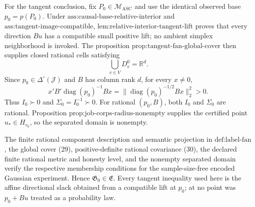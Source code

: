 For the tangent conclusion, fix \(P_0\in\mathcal M_{\mathrm{ASC}}\)
and use the identical observed base \(p_0=p(P_0)\).  Under
\(\text{ass:causal-base-relative-interior}\) and
\(\text{ass:tangent-image-compatible}\),
\(\text{lem:relative-interior-tangent-lift}\) proves that every
direction \(Bu\) has a compatible small positive lift; no ambient
simplex neighborhood is invoked.  The proposition
\(\text{prop:tangent-fan-global-cover}\) then supplies closed rational
cells satisfying
\[
 \bigcup_{v\in V}D_v^0=\mathbb R^d.
\tag{29}
\]
Since \(p_0\in\Delta^\circ(\mathcal J)\) and \(B\) has column rank
\(d\), for every \(x\ne0\),
\[
 x'B'\operatorname{diag}(p_0)^{-1}Bx
 =\|\operatorname{diag}(p_0)^{-1/2}Bx\|_2^2>0.
\tag{30}
\]
Thus \(I_0\succ0\) and \(\Sigma_0=I_0^{-1}\succ0\).  For rational
\((p_0,B)\), both \(I_0\) and \(\Sigma_0\) are rational.  Proposition
\(\text{prop:job-corps-radius-nonempty}\) supplies the certified point
\(u_*\in H_{r_0}\), so the separated domain is nonempty.

The finite rational component description and semantic projection in
\(\text{def:label-fan}\), the global cover (29), positive-definite
rational covariance (30), the declared finite rational metric and
honesty level, and the nonempty separated domain verify the respective
membership conditions for the sample-size-free encoded Gaussian
experiment.  Hence \(\mathfrak G_0\in\mathfrak E\).  Every tangent
inequality used here is the affine directional slack obtained from a
compatible lift at \(p_0\); at no point was \(p_0+Bu\) treated as a
probability law.
